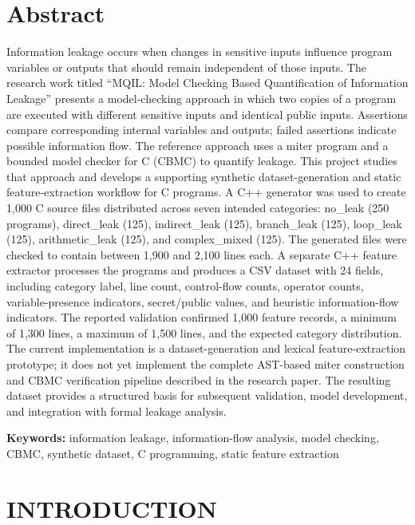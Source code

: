 \documentclass[12pt,a4paper,oneside]{report}
\begin{document}
\chapter*{Abstract}
Information leakage occurs when changes in sensitive inputs influence program variables or outputs that should remain independent of those inputs. The research work titled ``MQIL: Model Checking Based Quantification of Information Leakage'' presents a model-checking approach in which two copies of a program are executed with different sensitive inputs and identical public inputs. Assertions compare corresponding internal variables and outputs; failed assertions indicate possible information flow. The reference approach uses a miter program and a bounded model checker for C (CBMC) to quantify leakage. This project studies that approach and develops a supporting synthetic dataset-generation and static feature-extraction workflow for C programs. A C++ generator was used to create 1,000 C source files distributed across seven intended categories: no\_leak (250 programs), direct\_leak (125), indirect\_leak (125), branch\_leak (125), loop\_leak (125), arithmetic\_leak (125), and complex\_mixed (125). The generated files were checked to contain between 1,900 and 2,100 lines each. A separate C++ feature extractor processes the programs and produces a CSV dataset with 24 fields, including category label, line count, control-flow counts, operator counts, variable-presence indicators, secret/public values, and heuristic information-flow indicators. The reported validation confirmed 1,000 feature records, a minimum of 1,300 lines, a maximum of 1,500 lines, and the expected category distribution. The current implementation is a dataset-generation and lexical feature-extraction prototype; it does not yet implement the complete AST-based miter construction and CBMC verification pipeline described in the research paper. The resulting dataset provides a structured basis for subsequent validation, model development, and integration with formal leakage analysis.\par
\noindent\textbf{Keywords:} information leakage, information-flow analysis, model checking, CBMC, synthetic dataset, C programming, static feature extraction\par
\tableofcontents
\clearpage
{}

\chapter{INTRODUCTION}
\end{document}
